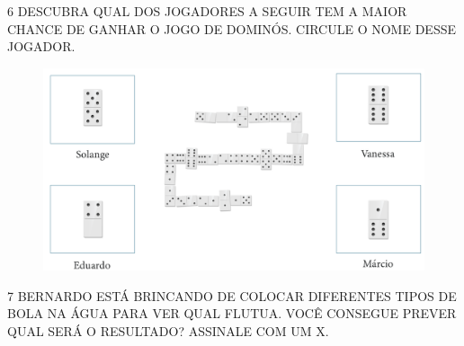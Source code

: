 \pagebreak
\num{6} DESCUBRA QUAL DOS JOGADORES A SEGUIR TEM A MAIOR CHANCE DE GANHAR O JOGO
DE DOMINÓS. CIRCULE O NOME DESSE JOGADOR.


\begin{figure}[htpb!]
\includegraphics[width=\textwidth]{../ilustracoes/MAT1/SAEB_1ANO_MAT_FIGURA89.png}
\end{figure}


\num{7} BERNARDO ESTÁ BRINCANDO DE COLOCAR DIFERENTES TIPOS DE BOLA NA ÁGUA
PARA VER QUAL FLUTUA. VOCÊ CONSEGUE PREVER QUAL SERÁ O RESULTADO? ASSINALE
COM UM X.


